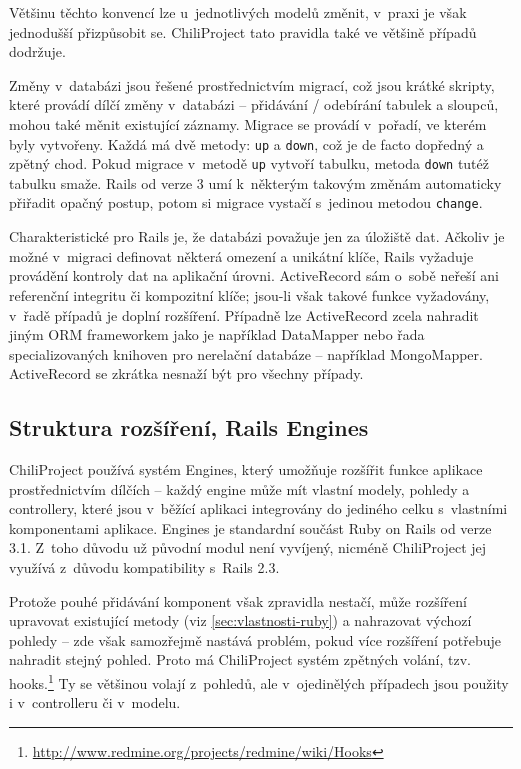 \documentclass[thesis=B,czech]{FITthesis}[2012/05/02]
\begin{document}
Většinu těchto konvencí lze u~jednotlivých modelů změnit, v~praxi je
však jednodušší přizpůsobit se. ChiliProject tato pravidla také ve
většině případů dodržuje.

Změny v~databázi jsou řešené prostřednictvím migrací, což jsou krátké
skripty, které provádí dílčí změny v~databázi -- přidávání / odebírání
tabulek a sloupců, mohou také měnit existující záznamy. Migrace se
provádí v~pořadí, ve kterém byly vytvořeny. Každá má dvě metody:
\lstinline!up! a \lstinline!down!, což je de facto dopředný a zpětný
chod. Pokud migrace v~metodě \lstinline!up! vytvoří tabulku, metoda
\lstinline!down! tutéž tabulku smaže. Rails od verze 3 umí k~některým
takovým změnám automaticky přiřadit opačný postup, potom si migrace
vystačí s~jedinou metodou \lstinline!change!.

Charakteristické pro Rails je, že databázi považuje jen za 
úložiště dat. Ačkoliv je možné v~migraci definovat některá omezení a unikátní klíče,
Rails vyžaduje provádění kontroly dat na aplikační úrovni.
ActiveRecord sám o~sobě neřeší ani referenční integritu či
kompozitní klíče; jsou-li však takové funkce vyžadovány, v~řadě případů
je doplní rozšíření. Případně lze ActiveRecord zcela nahradit jiným ORM
frameworkem jako je například DataMapper nebo řada specializovaných
knihoven pro nerelační databáze -- například MongoMapper. ActiveRecord
se zkrátka nesnaží být  pro všechny případy.

\subsection{Struktura rozšíření, Rails Engines}

ChiliProject používá systém Engines, který umožňuje rozšířit
funkce aplikace prostřednictvím dílčích  -- každý
engine může mít vlastní modely, pohledy a controllery, které jsou
v~běžící aplikaci integrovány do jediného celku s~vlastními komponentami
aplikace. Engines je standardní součást Ruby on Rails od verze 3.1.
Z~toho důvodu už původní modul není vyvíjený, nicméně ChiliProject jej
využívá z~důvodu kompatibility s~Rails 2.3.

Protože pouhé přidávání komponent však zpravidla nestačí, může rozšíření
upravovat existující metody (viz
\ref{sec:vlastnosti-ruby}) a
nahrazovat výchozí pohledy -- zde však samozřejmě nastává problém, pokud
více rozšíření potřebuje nahradit stejný pohled. Proto má ChiliProject
systém zpětných volání, tzv. hooks.\footnote{\url{http://www.redmine.org/projects/redmine/wiki/Hooks}}
Ty se většinou volají z~pohledů, ale v~ojedinělých případech jsou
použity i v~controlleru či v~modelu.
\end{document}
